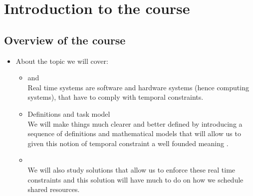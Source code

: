 \chapter{Introduction to the course}
\section{Overview of the course}

\begin{itemize}
\item {}

About the topic we will cover:
\begin{itemize}
\item {} and \\
Real time systems are software and hardware systems (hence computing systems), that have to comply with temporal constraints.
\item Definitions and task model\\
We will make things much clearer and better defined by introducing a sequence of definitions and mathematical models that will allow us to given this notion of temporal constraint a well founded meaning .
\item {}\\
We will also study solutions that allow us to enforce these real time constraints and this solution will have much to do on how we schedule shared resources.
\end{itemize}


\end{itemize}

